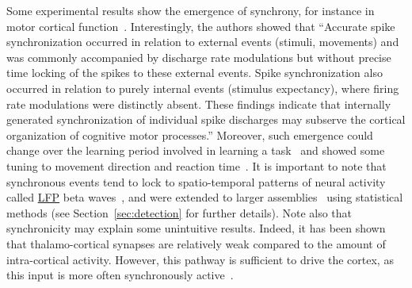 \documentclass[brainsci, %
               review,submit,pdftex,moreauthors
               ]{Definitions/mdpi}
\begin{document}
Some experimental results show the emergence of synchrony, for instance in motor cortical function~\citep{riehle_spike_1997}. Interestingly, the authors showed that ``Accurate spike synchronization occurred in relation to external events (stimuli, movements) and was commonly accompanied by discharge rate modulations but without precise time locking of the spikes to these external events. Spike synchronization also occurred in relation to purely internal events (stimulus expectancy), where firing rate modulations were distinctly absent. These findings indicate that internally generated synchronization of individual spike discharges may subserve the cortical organization of cognitive motor processes.'' Moreover, such emergence could change over the learning period involved in learning a task~\citep{kilavik_long-term_2009} and showed some tuning to movement direction and reaction time~\citep{grammont_spike_2003}. It is important to note that synchronous events tend to lock to spatio-temporal patterns of neural activity called \href{https://en.wikipedia.org/wiki/Local_field_potential}{LFP} beta waves~\citep{denker_lfp_2018}, and were extended to larger assemblies~\citep{torre_synchronous_2016, torre_asset_2016} using statistical methods (see Section~\ref{sec:detection} for further details). Note also that synchronicity may explain some unintuitive results. Indeed, it has been shown that thalamo-cortical synapses are relatively weak compared to the amount of intra-cortical activity. However, this pathway is sufficient to drive the cortex, as this input is more often synchronously active~\citep{bruno_cortex_2006}. 
\end{document}
